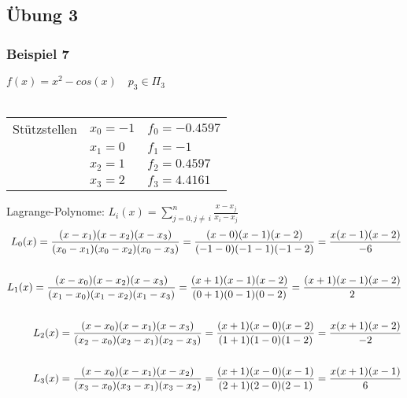 \subsection{Übung 3}
\subsubsection{Beispiel 7}
$f(x)=x^2-cos(x) \quad p_3 \in \Pi_3$\\\\
\begin{tabular}{cll}
Stützstellen& $x_0=-1$ & $f_0=-0.4597$ \\
& $x_1=0$ & $f_1=-1$ \\
& $x_2=1$ & $f_2=0.4597$ \\
& $x_3=2$ & $f_3=4.4161$ \\
\end{tabular}
Lagrange-Polynome: $L_i(x)=\sum\limits_{j=0,j\neq\,i}^{n}{\frac{x-x_j}{x_i-x_j}}$\\

\begin{align*}
L_0(x)=\frac{(x-x_1)(x-x_2)(x-x_3)}{(x_0-x_1)(x_0-x_2)(x_0-x_3)}=\frac{(x-0)(x-1)(x-2)}{(-1-0)(-1-1)(-1-2)}={\frac{x(x-1)(x-2)}{-6}}\\
\vspace{0.5cm}\\
L_1(x)=\frac{(x-x_0)(x-x_2)(x-x_3)}{(x_1-x_0)(x_1-x_2)(x_1-x_3)}=\frac{(x+1)(x-1)(x-2)}{(0+1)(0-1)(0-2)}={\frac{(x+1)(x-1)(x-2)}{2}}\\
\vspace{0.5cm}\\
L_2(x)=\frac{(x-x_0)(x-x_1)(x-x_3)}{(x_2-x_0)(x_2-x_1)(x_2-x_3)}=\frac{(x+1)(x-0)(x-2)}{(1+1)(1-0)(1-2)}={\frac{x(x+1)(x-2)}{-2}}\\
\vspace{0.5cm}\\
L_3(x)=\frac{(x-x_0)(x-x_1)(x-x_2)}{(x_3-x_0)(x_3-x_1)(x_3-x_2)}=\frac{(x+1)(x-0)(x-1)}{(2+1)(2-0)(2-1)}={\frac{x(x+1)(x-1)}{6}}
\end{align*}

